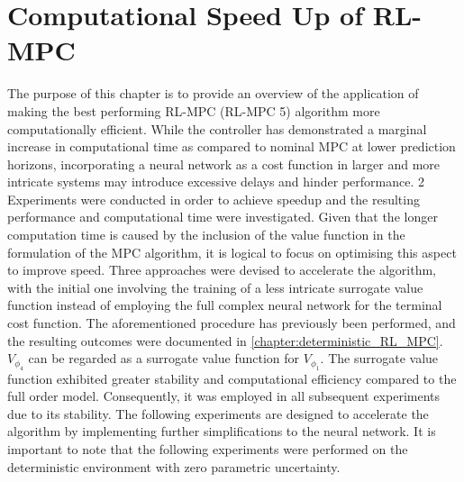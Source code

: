 \chapter{Computational Speed Up of RL-MPC}
\label{chapter:speed-up}

The purpose of this chapter is to provide an overview of the application of making the  best performing RL-MPC (RL-MPC 5) algorithm more computationally efficient. While the controller has demonstrated a marginal increase in computational time as compared to nominal MPC at lower prediction horizons, incorporating a neural network as a cost function in larger and more intricate systems may introduce excessive delays and hinder performance. 2 Experiments were conducted in order to achieve speedup and the resulting performance and computational time were investigated. Given that the longer computation time is caused by the inclusion of the value function in the formulation of the MPC algorithm, it is logical to focus on optimising this aspect to improve speed. Three approaches were devised to accelerate the algorithm, with the initial one involving the training of a less intricate surrogate value function instead of employing the full complex neural network for the terminal cost function. The aforementioned procedure has previously been performed, and the resulting outcomes were documented in \autoref{chapter:deterministic_RL_MPC}. ${V}_{\phi_4}$ can be regarded as a surrogate value function for ${V}_{\phi_1}$. The surrogate value function exhibited greater stability and computational efficiency compared to the full order model. Consequently, it was employed in all subsequent experiments due to its stability. The following experiments are designed to accelerate the algorithm by implementing further simplifications to the neural network. It is important to note that the following experiments were performed on the deterministic environment with zero parametric uncertainty.

